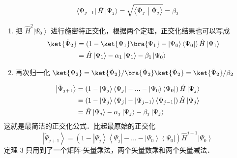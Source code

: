 {\noindent {}}
\begin{equation}
\left\langle {{\Psi_{j - 1}}} \right|\hat H\left| {{\Psi_j}} \right\rangle  = \sqrt {\left\langle {{{{\tilde \Psi }_j}}}
 \mathrel{\left | {\vphantom {{{{\tilde \Psi }_j}} {{{\tilde \Psi }_j}}}}
 \right. \kern-\nulldelimiterspace}
 {{{{\tilde \Psi }_j}}} \right\rangle }  = {\beta_j}
\end{equation}

\begin{enumerate}[resume]
\item 把 ${\hat H^2}\left| {{\Psi_0}} \right\rangle$ 进行施密特正交化，根据两个定理，正交化结果也可以写成
\begin{equation}
\begin{aligned}
\ket{{{\tilde \Psi }_2}}  &= \left( {1 -\ket{{\Psi_1}}  \bra {{\Psi_1}}  - \left| {{\Psi_0}} \right\rangle \left\langle {{\Psi_0}} \right|} \right)\hat H\left| {{\Psi_1}} \right\rangle \\
   &= \hat H\left| {{\Psi_1}} \right\rangle  - {\alpha_1}\left| {{\Psi_1}} \right\rangle  - {\beta_1}\left| {{\Psi_0}} \right\rangle \\ 
\end{aligned}
\end{equation}
\item 再次归一化  $\ket{\Psi_2} = \ket{\tilde\Psi_2}/\bra{\tilde\Psi_2}\ket{\tilde\Psi_2} = \ket{\tilde\Psi_2}/\beta_2$
\end{enumerate}

{\noindent {}}
\begin{equation}\begin{aligned}
  \left| {{{\tilde \Psi }_{j + 1}}} \right\rangle  &= \left( {1 - \left| {{\Psi_j}} \right\rangle \left\langle {{\Psi_j}} \right| - ... - \left| {{\Psi_0}} \right\rangle \left\langle {{\Psi_0}} \right|} \right)\hat H\left| {{\Psi_j}} \right\rangle\\
&= \left( {1 - \left| {{\Psi_j}} \right\rangle \left\langle {{\Psi_j}} \right| - \left| {{\Psi_{j - 1}}} \right\rangle \left\langle {{\Psi_{j - 1}}} \right|} \right)\hat H\left| {{\Psi_j}} \right\rangle  \hfill \\
&= \hat H\left| {{\Psi_j}} \right\rangle  - {\alpha_j}\left| {{\Psi_j}} \right\rangle  - {\beta_j}\left| {{\Psi_j}} \right\rangle 
\end{aligned}\end{equation}
这就是最简洁的正交化公式．比起最原始的正交化
\begin{equation}
\left| {{{\tilde \Psi }_{j + 1}}} \right\rangle  = \left( {1 - \left| {{\Psi_j}} \right\rangle \left\langle {{\Psi_j}} \right| - ... - \left| {{\Psi_0}} \right\rangle \left\langle {{\Psi_0}} \right|} \right){\hat H^{j + 1}}\left| {{\Psi_0}} \right\rangle 
\end{equation}
定理 3 只用到了一个矩阵-矢量乘法，两个矢量数乘和两个矢量减法．

